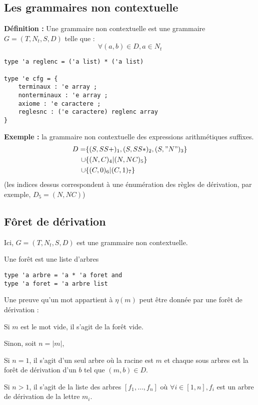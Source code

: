 \documentclass[a4paper,10pt
]{article}
\newcommand{\norm}[1]{\lvert #1 \rvert}
\newlength{\mydepth}
\newlength{\myheight}
\newenvironment{answer}
{\par\begin{lrbox}{\mybox}\quad\begin{minipage}{\linewidth}\color{black}\setlength{\parskip}{10pt plus 1pt minus 1pt}\vspace*{-.7\baselineskip}}
{\end{minipage}\end{lrbox}
\settodepth{\mydepth}{\usebox{\mybox}}
\settoheight{\myheight}{\usebox{\mybox}}
\addtolength{\myheight}{\mydepth}
\noindent\makebox[0pt]{
  \color{gray}\hspace{-0pt}\rule[-\mydepth]{1pt}{\myheight}}
  \usebox{\mybox}
  }
\begin{document}
\subsection{Les grammaires non contextuelle}

\textbf{  Définition : } Une grammaire non contextuelle est une grammaire $G = (T,N_t,S,D)$ telle que :
\begin{equation*} \forall (a,b) \in D, a \in N_t  \end{equation*}


\begin{verbatim}
type 'a reglenc = ('a list) * ('a list)

type 'e cfg = {
    terminaux : 'e array ;
    nonterminaux : 'e array ;
    axiome : 'e caractere ;
    reglesnc : ('e caractere) reglenc array 
}
\end{verbatim}

\textbf{ Exemple : } la grammaire non contextuelle des expressions arithmétiques suffixes.
\begin{align*}
D = &\{(S,SS+)_1,(S,SS*)_2,(S,"N")_3\}\\
\cup&\{(N,C)_4 | (N,NC)_5\}\\
\cup&\{(C,0)_6 | (C,1)_7\}
\end{align*}
(les indices dessus correspondent à une énumération des règles de dérivation, par exemple, $D_5 = (N,NC)$)

\subsection{Fôret de dérivation}

Ici, $G = (T,N_t,S,D)$ est une grammaire non contextuelle.

Une forêt est une liste d'arbres
\begin{verbatim}
type 'a arbre = 'a * 'a foret and
type 'a foret = 'a arbre list
\end{verbatim}


Une preuve qu'un mot appartient à $\eta(m)$ peut être donnée par une forêt de dérivation :

\begin{answer} 
Si $m$ est le mot vide, il s'agit de la forêt vide.

Sinon, soit $n = \norm{m}$,\\
\begin{answer} 
    Si $n=1$, il s'agit d'un seul arbre où la racine est $m$ et chaque sous arbres est la forêt de dérivation d'un $b$ tel que $(m,b) \in D$.

    Si $n>1$, il s'agit de la liste des arbres $[f_1, \dots, f_n]$ où $\forall i \in [1,n], f_i$ est un arbre de dérivation de la lettre $m_i$.
\end{answer}
\end{answer}
\end{document}
